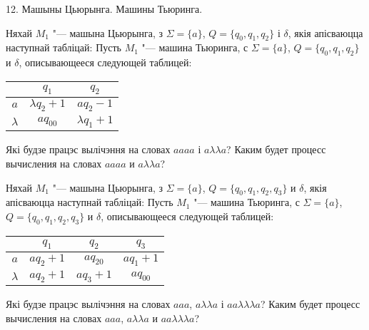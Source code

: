 \documentclass[12pt, a4paper]{article}
\begin{document}
\biLangHeader
{12. Машыны Цьюрынга.}
{Машины Тьюринга.}

\begin{problemList}

\problemItemWithCommonPartComplicated
{Няхай $M_1$ "--- машына Цьюрынга, з $\Sigma=\{a\}$, $Q=\{q_0, q_1, q_2\}$ і $\delta$, якія апісваюцца наступнай табліцай:}
{Пусть $M_1$ "--- машина Тьюринга, с $\Sigma=\{a\}$, $Q=\{q_0, q_1, q_2\}$ и $\delta$, описывающееся следующей таблицей:}
{%
\begin{center}
    \begin{tabular}{|c|c|c|}
        \hline
        & $q_1$ & $q_2$ \\ \hline
        $a$ & $\lambda q_2 +1$ & $aq_2-1$ \\ \hline
        $\lambda$ & $aq_00$ & $\lambda q_1 +1$ \\ \hline
    \end{tabular}
\end{center}
}
{Які будзе працэс вылічэння на словах $aaaa$ і $a\lambda\lambda a$?}
{Каким будет процесс вычисления на словах $aaaa$ и $a\lambda\lambda a$?}

\bigskip

\problemItemWithCommonPartComplicated
{Няхай $M_1$ "--- машына Цьюрынга, з $\Sigma=\{a\}$, $Q=\{q_0, q_1, q_2, q_3\}$ и $\delta$, якія апісваюцца наступнай табліцай:}
{Пусть $M_1$ "--- машина Тьюринга, с $\Sigma=\{a\}$, $Q=\{q_0, q_1, q_2, q_3\}$ и $\delta$, описывающееся следующей таблицей:}
{%
\begin{center}
    \begin{tabular}{|c|c|c|c|}
        \hline
        & $q_1$ & $q_2$ & $q_3$ \\ \hline
        $a$ & $aq_2+1$ & $aq_20$ & $aq_1+1$ \\ \hline
        $\lambda$ & $aq_2+1$ & $aq_3+1$ & $aq_00$\\ \hline
    \end{tabular}
\end{center}
}
{Які будзе працэс вылічэння на словах $aaa$, $a\lambda\lambda a$ і $aa\lambda\lambda\lambda a$?}
{Каким будет процесс вычисления на словах $aaa$, $a\lambda\lambda a$ и $aa\lambda\lambda\lambda a$?}

\bigskip


\end{problemList}
\end{document}
